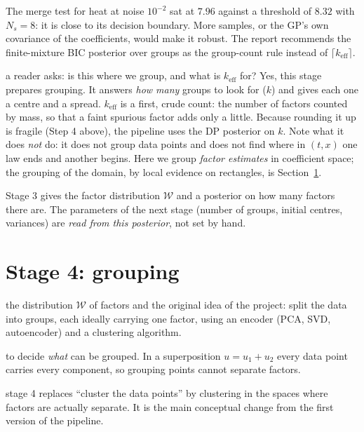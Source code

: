 \documentclass[11pt,a4paper]{article}
\theoremstyle{definition}
\newcommand{\sectionbrief}[3]{\begin{leadin}\begin{description}[nosep,leftmargin=3.0cm,labelwidth=2.8cm]
  \item[Starting from] #1
  \item[Why this section] #2
  \item[Role in the paper] #3
  \end{description}\end{leadin}}
\begin{document}
\begin{caution}[title=Thin margins]
The merge test for heat at noise $10^{-2}$ sat at $7.96$ against a threshold of $8.32$ with $N_s=8$: it is close to its decision boundary. More samples, or the GP's own covariance of the coefficients, would make it robust. The report recommends the finite-mixture BIC posterior over groups as the group-count rule instead of $\lceil k_{\mathrm{eff}}\rceil$.
\end{caution}

\begin{explained}{a reader asks: is this where we group, and what is $k_{\mathrm{eff}}$ for?}
Yes, this stage prepares grouping. It answers \emph{how many} groups to look for ($k$) and gives each one a centre and a spread. $k_{\mathrm{eff}}$ is a first, crude count: the number of factors counted by mass, so that a faint spurious factor adds only a little. Because rounding it up is fragile (Step 4 above), the pipeline uses the DP posterior on $k$. Note what it does \emph{not} do: it does not group data points and does not find where in $(t,x)$ one law ends and another begins. Here we group \emph{factor estimates} in coefficient space; the grouping of the domain, by local evidence on rectangles, is Section~\ref{sec:group}.
\end{explained}

\begin{takeaway}
Stage 3 gives the factor distribution $\mathcal W$ and a posterior on how many factors there are. The parameters of the next stage (number of groups, initial centres, variances) are \emph{read from this posterior}, not set by hand.
\end{takeaway}



\section{Stage 4: grouping}\label{sec:group}
\sectionbrief
{the distribution $\mathcal W$ of factors and the original idea of the project: split the data into groups, each ideally carrying one factor, using an encoder (PCA, SVD, autoencoder) and a clustering algorithm.}
{to decide \emph{what} can be grouped. In a superposition $u=u_1+u_2$ every data point carries every component, so grouping points cannot separate factors.}
{stage 4 replaces ``cluster the data points'' by clustering in the spaces where factors are actually separate. It is the main conceptual change from the first version of the pipeline.}
\end{document}
